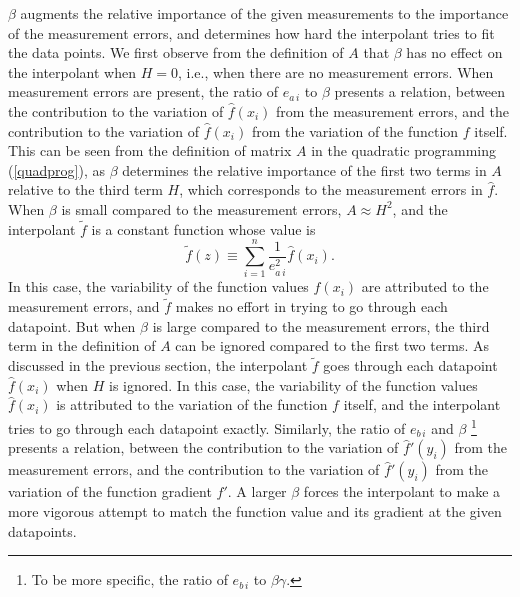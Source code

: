 $\beta$ augments the relative importance of the given measurements to the
importance of the measurement
errors, and determines how hard the interpolant tries to fit the data
points.  We first observe from the definition of $A$ that $\beta$ has no
effect on the interpolant when $H=0$, i.e.,
when there are no measurement errors.
When measurement errors are present, the ratio of $e_{a\,i}$ to $\beta$
presents a relation, between
the contribution to the variation of ${\hat f}(x_i)$ from the measurement
errors, and
the contribution to the variation of ${\hat f}(x_i)$ from the variation of
the function $f$ itself.
This can be seen from the definition of matrix $A$ in the quadratic programming
(\ref{quadprog}), as $\beta$ determines the relative importance of the first
two terms in $A$ relative to the third term $H$, which corresponds to the
measurement errors in $\hat f$.  When $\beta$ is small compared to the
measurement errors, $A\approx H^2$, and the interpolant $\tilde f$ is a
constant function whose value is
\[ {\tilde f}(z) \equiv \sum_{i=1}^n \frac{1}{e_{a\,i}^2} {\hat f}(x_i) . \]
In this case, the
variability of the function values $\hat f(x_i)$ are attributed to the
measurement errors, and $\tilde f$ makes no effort in trying to go through
each datapoint.  But when $\beta$ is large compared to
the measurement errors, the third term in the definition of $A$ can be ignored
compared to the first two terms.  As discussed in the previous section,
the interpolant $\tilde f$ goes through each
datapoint ${\hat f}(x_i)$ when $H$ is ignored.  In this case,
the variability of the function values $\hat f(x_i)$ is attributed to the
variation of the function $f$ itself, and the interpolant tries to go through
each datapoint exactly.  Similarly, the ratio of $e_{b\,i}$ and $\beta$
\footnote{To be more specific, the ratio of $e_{b\,i}$ to $\beta\gamma$.}
presents a relation, between
the contribution to the variation of ${\hat f}'(y_i)$ from the measurement
errors, and the
contribution to the variation of ${\hat f}'(y_i)$ from the variation of the
function gradient $f'$.  A larger
$\beta$ forces the interpolant to make a more vigorous attempt to match the
function value and its gradient at the given datapoints.

